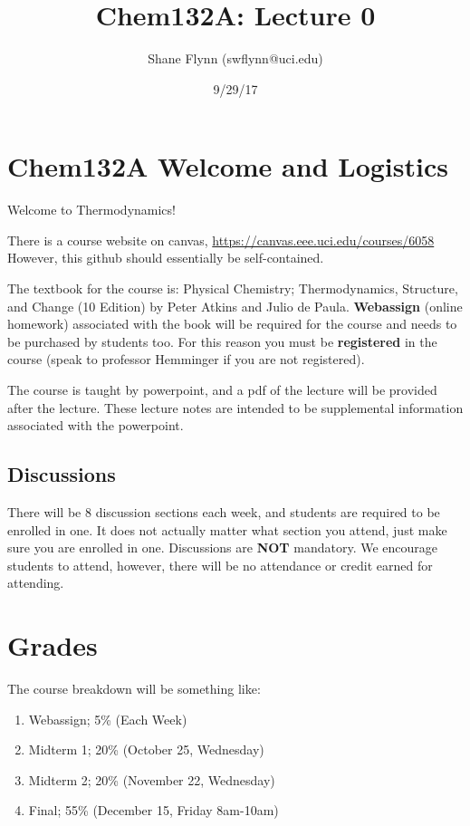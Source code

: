 \documentclass{article}
\title{Chem132A: Lecture 0}
\author{Shane Flynn (swflynn@uci.edu) }
\date{9/29/17}
\begin{document}
\maketitle

\section*{Chem132A Welcome and Logistics}
Welcome to Thermodynamics!

There is a course website on canvas,
\url{https://canvas.eee.uci.edu/courses/6058}
However, this github should essentially be self-contained. 

The textbook for the course is: Physical Chemistry; Thermodynamics, Structure, and Change (10 Edition) by Peter Atkins and Julio de Paula. 
\textbf{Webassign} (online homework) associated with the book will be required for the course and needs to be purchased by students too. 
For this reason you must be \textbf{registered} in the course (speak to professor Hemminger if you are not registered). 

The course is taught by powerpoint, and a pdf of the lecture will be provided after the lecture. 
These lecture notes are intended to be supplemental information associated with the powerpoint. 

\subsection*{Discussions}
There will be 8 discussion sections each week, and students are required to be enrolled in one. 
It does not actually matter what section you attend, just make sure you are enrolled in one. 
Discussions are \textbf{NOT} mandatory.
We encourage students to attend, however, there will be no attendance or credit earned for attending. 

\section*{Grades}
The course breakdown will be something like: 
\begin{enumerate}
\item Webassign; 5\% (Each Week)
\item Midterm 1; 20\% (October 25, Wednesday)
\item Midterm 2; 20\% (November 22, Wednesday)
\item Final; 55\% (December 15, Friday 8am-10am)
\end{enumerate}
\end{document}

